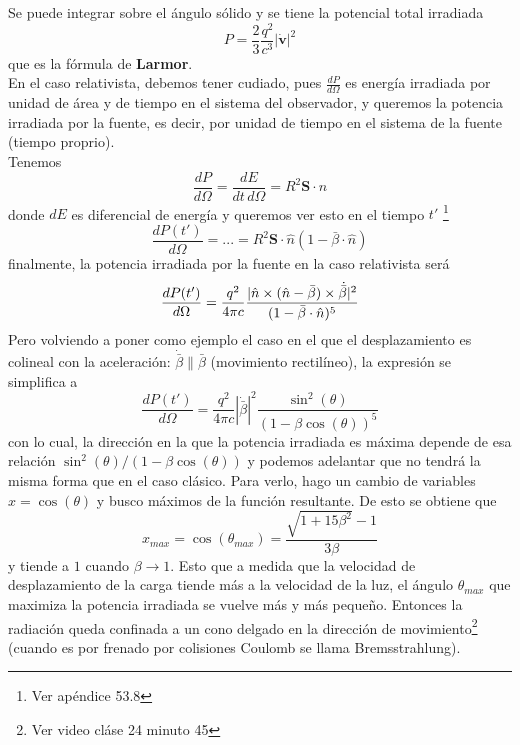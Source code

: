 \indent Se puede integrar sobre el ángulo sólido y se tiene la potencial total irradiada
\begin{equation}
    P = \frac{2}{3}\frac{q^{2}}{c^{3}}|\dot{\textbf{v}}|^{2}
        \label{ec:Larmor}
\end{equation}
que es la fórmula de \textbf{Larmor}.\\
\indent En el caso relativista, debemos tener cudiado, pues $\frac{dP}{d\Omega}$ es energía irradiada por unidad de área y de tiempo en el sistema del observador, y queremos la potencia irradiada por la fuente, es decir, por unidad de tiempo en el sistema de la fuente (tiempo proprio).\\
\indent Tenemos 
\begin{equation*}
    \frac{dP}{d\Omega} 
    = \frac{dE}{dt\,d\Omega}
    = R^{2} \textbf{S}\cdot \hat{n}
\end{equation*}
donde $dE$ es diferencial de energía y queremos ver esto en el tiempo $t'$ \footnote{Ver apéndice 53.8}
\begin{equation*}
    \frac{dP(t')}{d\Omega} 
    = ... 
    = R^{2} \textbf{S} \cdot \hat{n} (1 - \bar{\beta}\cdot \hat{n})
\end{equation*}
finalmente, la potencia irradiada por la fuente en la caso relativista será
\begin{equation*}
    \frac{dP(t')}{d\Omega}
    = \frac{q^{2}}{4\pi c}
    \frac%
    {%
        |\hat{n} \times (\hat{n} - \bar{\beta})\times \dot{\bar{\beta}}|^{2}
    }%
    {%
        (1 - \bar{\beta}\cdot \hat{n})^{5}
    }
\end{equation*}
Pero volviendo a poner como ejemplo el caso en el que el desplazamiento es colineal con la aceleración: $\dot{\bar{\beta}}\parallel \bar{\beta}$ (movimiento rectilíneo), la expresión se simplifica a
\begin{equation*}
    \frac{dP(t')}{d\Omega} = 
    \frac{q^{2}}{4\pi c}|\dot{\bar{\beta}}|^{2}
    \frac{\sin^{2}{(\theta)}}{(1-\beta \cos{(\theta)})^{5}}
\end{equation*}
con lo cual, la dirección en la que la potencia irradiada es máxima depende de esa relación $\sin^{2}{(\theta)}/(1 - \beta \cos{(\theta)})$ y podemos adelantar que no tendrá la misma forma que en el caso clásico. Para verlo, hago un cambio de variables $x = \cos{(\theta)}$ y busco máximos de la función resultante. De esto se obtiene que
\begin{equation*}
    x_{max} 
    = \cos{(\theta_{max})} 
    = \frac{\sqrt{1 + 15 \beta^{2}} - 1}{3\beta}
\end{equation*}
y tiende a $1$ cuando $\beta \to 1$. Esto que a medida que la velocidad de desplazamiento de la carga tiende más a la velocidad de la luz, el ángulo $\theta_{max}$ que maximiza la potencia irradiada se vuelve más y más pequeño. Entonces la radiación queda confinada a un cono delgado en la dirección de movimiento\footnote{Ver video cláse 24 minuto 45} (cuando es por frenado por colisiones Coulomb se llama Bremsstrahlung).



